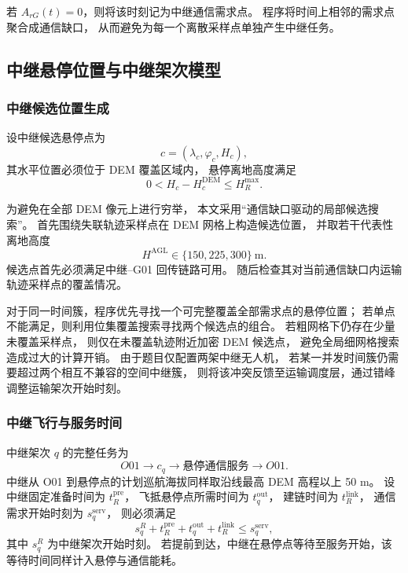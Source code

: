 若 $A_{rG}(t)=0$，则将该时刻记为中继通信需求点。
程序将时间上相邻的需求点聚合成通信缺口，
从而避免为每一个离散采样点单独产生中继任务。

\subsection{中继悬停位置与中继架次模型}

\subsubsection{中继候选位置生成}

设中继候选悬停点为
\[
c=(\lambda_c,\varphi_c,H_c),
\]
其水平位置必须位于 DEM 覆盖区域内，
悬停离地高度满足
\begin{equation}
	0<H_c-H_c^{\mathrm{DEM}}
	\le H_R^{\max}.
	\label{eq:q3-relay-height}
\end{equation}

为避免在全部 DEM 像元上进行穷举，
本文采用“通信缺口驱动的局部候选搜索”。
首先围绕失联轨迹采样点在 DEM 网格上构造候选位置，
并取若干代表性离地高度
\[
H^{\mathrm{AGL}}\in\{150,225,300\}\ \mathrm{m}.
\]
候选点首先必须满足中继--G01 回传链路可用。
随后检查其对当前通信缺口内运输轨迹采样点的覆盖情况。

对于同一时间簇，程序优先寻找一个可完整覆盖全部需求点的悬停位置；
若单点不能满足，则利用位集覆盖搜索寻找两个候选点的组合。
若粗网格下仍存在少量未覆盖采样点，
则仅在未覆盖轨迹附近加密 DEM 候选点，
避免全局细网格搜索造成过大的计算开销。
由于题目仅配置两架中继无人机，
若某一并发时间簇仍需要超过两个相互不兼容的空间中继簇，
则将该冲突反馈至运输调度层，通过错峰调整运输架次开始时刻。

\subsubsection{中继飞行与服务时间}

中继架次 $q$ 的完整任务为
\[
O01\rightarrow c_q
\rightarrow\text{悬停通信服务}
\rightarrow O01.
\]
中继从 O01 到悬停点的计划巡航海拔同样取沿线最高 DEM 高程以上 50 m。
设中继固定准备时间为 $t_R^{\mathrm{pre}}$，
飞抵悬停点所需时间为 $t_q^{\mathrm{out}}$，
建链时间为 $t_R^{\mathrm{link}}$，
通信需求开始时刻为 $s_q^{\mathrm{serv}}$，
则必须满足
\begin{equation}
	s_q^{R}
	+t_R^{\mathrm{pre}}
	+t_q^{\mathrm{out}}
	+t_R^{\mathrm{link}}
	\le s_q^{\mathrm{serv}},
	\label{eq:q3-relay-ready}
\end{equation}
其中 $s_q^R$ 为中继架次开始时刻。
若提前到达，中继在悬停点等待至服务开始，该等待时间同样计入悬停与通信能耗。

